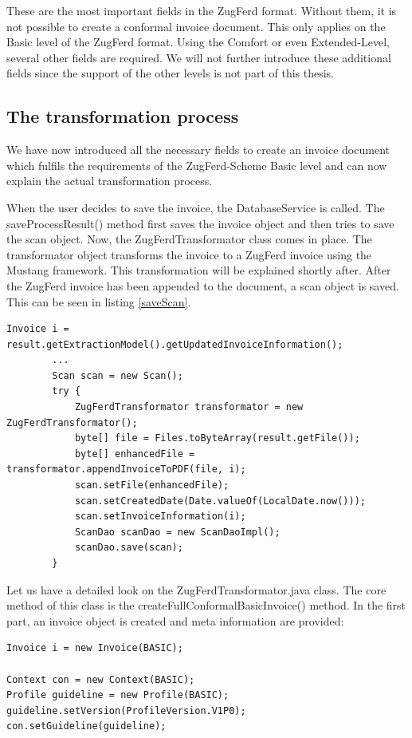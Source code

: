 These are the most important fields in the ZugFerd format. Without them, it is not possible to create a conformal invoice document. This only applies on the Basic level of the ZugFerd format. Using the Comfort or even Extended-Level, several other fields are required. We will not further introduce these additional fields since the support of the other levels is not part of this thesis. 

\subsection{The transformation process}

We have now introduced all the necessary fields to create an invoice document which fulfils the requirements of the ZugFerd-Scheme Basic level and can now explain the actual transformation process. 

When the user decides to save the invoice, the DatabaseService is called. The saveProcessResult() method first saves the invoice object and then tries to save the scan object. Now, the ZugFerdTransformator class comes in place. The transformator object transforms the invoice to a ZugFerd invoice using the Mustang framework. This transformation will be explained shortly after. After the ZugFerd invoice has been appended to the document, a scan object is saved. This can be seen in listing \ref{saveScan}.

\begin{lstlisting}[caption={}, label={saveScan}]
        Invoice i = result.getExtractionModel().getUpdatedInvoiceInformation();
        ...
        Scan scan = new Scan();
        try {
            ZugFerdTransformator transformator = new ZugFerdTransformator();
            byte[] file = Files.toByteArray(result.getFile());
            byte[] enhancedFile = transformator.appendInvoiceToPDF(file, i);
            scan.setFile(enhancedFile);
            scan.setCreatedDate(Date.valueOf(LocalDate.now()));
            scan.setInvoiceInformation(i);
            ScanDao scanDao = new ScanDaoImpl();
            scanDao.save(scan);
        }
\end{lstlisting}

Let us have a detailed look on the ZugFerdTransformator.java class. The core method of this class is the createFullConformalBasicInvoice() method. 
In the first part, an invoice object is created and meta information are provided:

\begin{lstlisting}[caption={Creation of the invoice object}]
Invoice i = new Invoice(BASIC);

Context con = new Context(BASIC);
Profile guideline = new Profile(BASIC);
guideline.setVersion(ProfileVersion.V1P0);
con.setGuideline(guideline);
\end{lstlisting}


